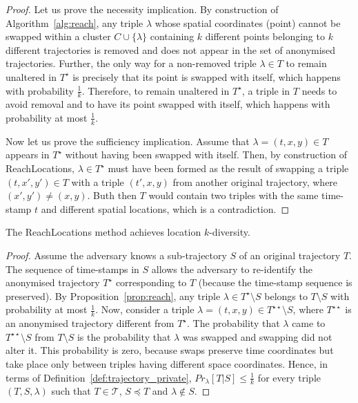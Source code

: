 \begin{proof}
Let us prove the necessity implication.
By construction of Algorithm~\ref{alg:reach},
any triple
$\lambda$ whose spatial coordinates (point)
cannot be swapped within a cluster
$C \cup \{\lambda\}$ containing $k$ different points
belonging to $k$ different trajectories
is removed and does not appear in the set of anonymised trajectories.
Further, the only way for a non-removed triple $\lambda \in T$ to remain
unaltered in $T^\star$ is precisely that its point is swapped with itself,
which happens with probability $\frac{1}{k}$.
Therefore, to remain unaltered in $T^\star$, a triple
in $T$ needs to avoid removal and to have its point swapped with itself,
which happens with probability at most $\frac{1}{k}$.

Now let us prove the sufficiency implication.
Assume that $\lambda=(t,x,y) \in T$ appears
in $T^\star$ without having been swapped with itself.
Then, by construction
of ReachLocations, $\lambda \in T^\star$ must have been formed as the result
of swapping a triple $(t,x',y') \in T$ with a triple $(t',x,y)$
from another original trajectory, where $(x',y') \neq (x,y)$.
Buth then $T$ would contain two triples with the same time-stamp $t$
and different spatial locations, which is a contradiction. 
\end{proof}

\begin{theorem}
The ReachLocations method achieves location $k$-diversity.
\end{theorem}

\begin{proof}
Assume the adversary knows a sub-trajectory
$S$ of an original trajectory $T$. The sequence of time-stamps
in $S$ allows the adversary to re-identify the anonymised trajectory
$T^\star$ corresponding to $T$ (because the time-stamp
sequence is preserved).
By Proposition~\ref{prop:reach}, any
triple $\lambda \in T^\star \setminus S$ belongs
to $T \setminus S$ with probability at most $\frac{1}{k}$.
Now, consider a triple $\lambda=(t,x,y) \in T^{\star\star} \setminus S$,
where $T^{\star\star}$ is an anonymised trajectory different
from $T^\star$.
The probability that $\lambda$ came to $T^{\star\star} \setminus S$ from
$T \setminus S$ is the probability that $\lambda$ was
swapped and swapping did not alter it. This probability is zero,
because swaps preserve time coordinates
but take place only between triples having different
space coordinates.
Hence, in terms of Definition~\ref{def:trajectory_private},
$Pr_\lambda[T|S] \leq \frac{1}{k}$ for every triple
$(T,S,\lambda)$ such that $T \in \mathcal{T}$, $S \preceq T$
and $\lambda \not\in S$. 
\end{proof}


